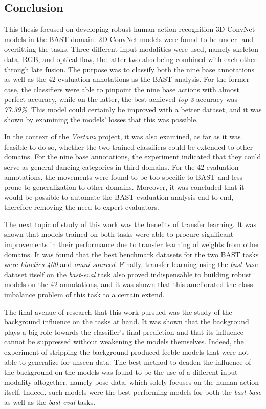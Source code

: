 \documentclass[extern,palatino]{cgMA}
\begin{document}
\subsection{Conclusion}
\label{conclusion}

This thesis focused on developing robust human action recognition 3D ConvNet models in the BAST domain. 2D ConvNet models were found to be under- and overfitting the tasks. Three different input modalities were used, namely skeleton data, RGB, and optical flow, the latter two also being combined with each other through late fusion. The purpose was to classify both the nine base annotations as well as the 42 evaluation annotations as the BAST analysis. For the former case, the classifiers were able to pinpoint the nine base actions with almost perfect accuracy, while on the latter, the best achieved \textit{top-3} accuracy was \textit{77.39\%}. This model could certainly be improved with a better dataset, and it was shown by examining the models' losses that this was possible.

\bigskip
\noindent In the context of the \textit{Vortanz} project, it was also examined, as far as it was feasible to do so, whether the two trained classifiers could be extended to other domains. For the nine base annotations, the experiment indicated that they could serve as general dancing categories in third domains. For the 42 evaluation annotations, the movements were found to be too specific to BAST and less prone to generalization to other domains. Moreover, it was concluded that it would be possible to automate the BAST evaluation analysis end-to-end, therefore removing the need to expert evaluators.

\bigskip
\noindent The next topic of study of this work was the benefits of transfer learning. It was shown that models trained on both tasks were able to procure significant improvements in their performance due to transfer learning of weights from other domains. It was found that the best benchmark datasets for the two BAST tasks were \textit{kinetics-400} and \textit{omni-sourced}. Finally, transfer learning using the \textit{bast-base} dataset itself on the \textit{bast-eval} task also proved indispensable to building robust models on the 42 annotations, and it was shown that this ameliorated the class-imbalance problem of this task to a certain extend.

\bigskip
\noindent The final avenue of research that this work pursued was the study of the background influence on the tasks at hand. It was shown that the background plays a big role towards the classifier's final prediction and that its influence cannot be suppressed without weakening the models themselves. Indeed, the experiment of stripping the background produced feeble models that were not able to generalize for unseen data. The best method to deaden the influence of the background on the models was found to be the use of a different input modality altogether, namely pose data, which solely focuses on the human action itself. Indeed, such models were the best performing models for both the \textit{bast-base} as well as the \textit{bast-eval} tasks.
\end{document}
